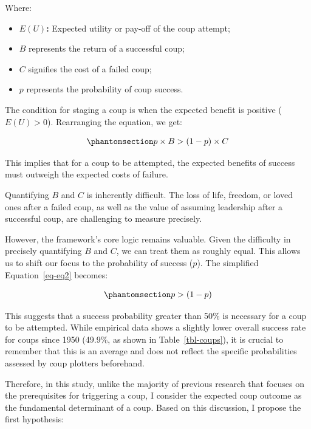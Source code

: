 \documentclass[
  12pt,
]{report}
\providecommand{\tightlist}{%
  \setlength{\itemsep}{0pt}\setlength{\parskip}{0pt}}\usepackage{longtable,booktabs,array}
\begin{document}
Where:

\begin{itemize}
\tightlist
\item
  \(E(U)\)\textbf{:} Expected utility or pay-off of the coup attempt;
\item
  \(B\) represents the return of a successful coup;
\item
  \(C\) signifies the cost of a failed coup;
\item
  \(p\) represents the probability of coup success.
\end{itemize}

The condition for staging a coup is when the expected benefit is
positive (\(E(U) > 0\)). Rearranging the equation, we get:

\begin{equation}\phantomsection\label{eq-eq2}{
\begin{aligned}
p \times B > (1 - p) \times C
\end{aligned}
}\end{equation}

This implies that for a coup to be attempted, the expected benefits of
success must outweigh the expected costs of failure.

Quantifying \(B\) and \(C\) is inherently difficult. The loss of life,
freedom, or loved ones after a failed coup, as well as the value of
assuming leadership after a successful coup, are challenging to measure
precisely.

However, the framework's core logic remains valuable. Given the
difficulty in precisely quantifying \(B\) and \(C\), we can treat them
as roughly equal. This allows us to shift our focus to the probability
of success (\(p\)). The simplified Equation~\ref{eq-eq2} becomes:

\begin{equation}\phantomsection\label{eq-eq3}{
\begin{aligned}
p > (1-p)
\end{aligned}
}\end{equation}

This suggests that a success probability greater than 50\% is necessary
for a coup to be attempted. While empirical data shows a slightly lower
overall success rate for coups since 1950 (49.9\%, as shown in
Table~\ref{tbl-coups}), it is crucial to remember that this is an
average and does not reflect the specific probabilities assessed by coup
plotters beforehand.

Therefore, in this study, unlike the majority of previous research that
focuses on the prerequisites for triggering a coup, I consider the
expected coup outcome as the fundamental determinant of a coup. Based on
this discussion, I propose the first hypothesis:
\end{document}
